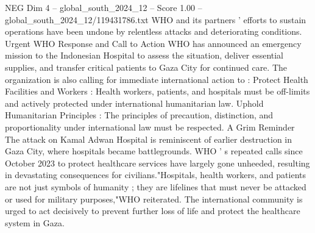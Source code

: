 \begin{textsample}{NEG Dim 4 – global\_south\_2024\_12 – Score 1.00 – global\_south\_2024\_12/119431786.txt}
WHO and its partners ' efforts to sustain operations have been undone by relentless attacks and deteriorating conditions.
Urgent WHO Response and Call to Action WHO has announced an emergency mission to the Indonesian Hospital to assess the situation, deliver essential supplies, and transfer critical patients to Gaza City for continued care.
The organization is also calling for immediate international action to : Protect Health Facilities and Workers : Health workers, patients, and hospitals must be off-limits and actively protected under international humanitarian law.
Uphold Humanitarian Principles : The principles of precaution, distinction, and proportionality under international law must be respected.
A Grim Reminder The attack on Kamal Adwan Hospital is reminiscent of earlier destruction in Gaza City, where hospitals became battlegrounds.
WHO ' s repeated calls since October 2023 to protect healthcare services have largely gone unheeded, resulting in devastating consequences for civilians."Hospitals, health workers, and patients are not just symbols of humanity ; they are lifelines that must never be attacked or used for military purposes,"WHO reiterated.
The international community is urged to act decisively to prevent further loss of life and protect the healthcare system in Gaza.

\end{textsample}
